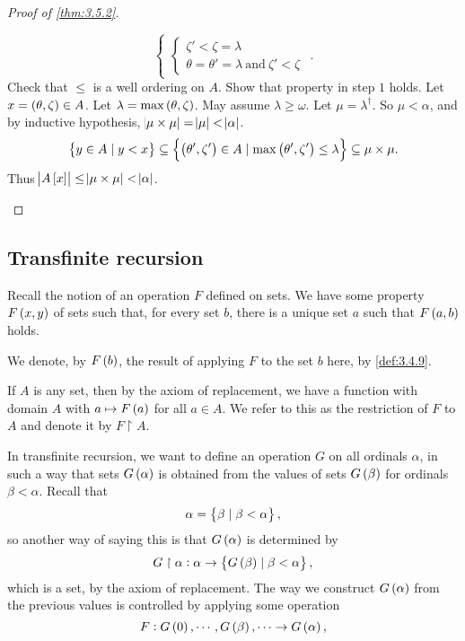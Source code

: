 \begin{proof}[Proof of \ref{thm:3.5.2}]
\begin{enumerate}[leftmargin=0.5in, label=Step \arabic*.]
$$\begin{cases}
\begin{cases}
\zeta' < \zeta = \lambda \\
\theta = \theta' = \lambda \ \text{and} \ \zeta' < \zeta
\end{cases}
\end{cases}.
$$
Check that $ \le $ is a well ordering on $ A $. Show that property in step $ 1 $ holds. Let $ x = \br{\theta, \zeta} \in A $. Let $ \lambda = \max\br{\theta, \zeta} $. May assume $ \lambda \ge \omega $. Let $ \mu = \lambda^\dagger $. So $ \mu < \alpha $, and by inductive hypothesis, $ \abs{\mu \times \mu} = \abs{\mu} < \abs{\alpha} $.
$$ \cbr{y \in A \mid y < x} \subseteq \cbr{\br{\theta', \zeta'} \in A \mid \max\br{\theta', \zeta'} \le \lambda} \subseteq \mu \times \mu. $$
Thus $ \abs{A\sbr{x}} \le \abs{\mu \times \mu} < \abs{\alpha} $.
\end{enumerate}
\end{proof}

\pagebreak

\subsection{Transfinite recursion}

Recall the notion of an operation $ F $ defined on sets. We have some property $ F\br{x, y} $ of sets such that, for every set $ b $, there is a unique set $ a $ such that $ F\br{a, b} $ holds.

\begin{notation*}
We denote, by $ F\br{b} $, the result of applying $ F $ to the set $ b $ here, by \ref{def:3.4.9}.
\end{notation*}

\begin{note*}
If $ A $ is any set, then by the axiom of replacement, we have a function with domain $ A $ with $ a \mapsto F\br{a} $ for all $ a \in A $. We refer to this as
the restriction of $ F $ to $ A $ and denote it by $ F \upharpoonright A $.
\end{note*}

In transfinite recursion, we want to define an operation $ G $ on all ordinals $ \alpha $, in such a way that sets $ G\br{\alpha} $ is obtained from the values of sets $ G\br{\beta} $ for ordinals $ \beta < \alpha $. Recall that
$$ \alpha = \cbr{\beta \mid \beta < \alpha}, $$
so another way of saying this is that $ G\br{\alpha} $ is determined by
$$ G \upharpoonright \alpha : \alpha \to \cbr{G\br{\beta} \mid \beta < \alpha}, $$
which is a set, by the axiom of replacement.
The way we construct $ G\br{\alpha} $ from the previous values is controlled by applying some operation
$$ F : G\br{0}, \cdots, G\br{\beta}, \dots \to G\br{\alpha}, $$

